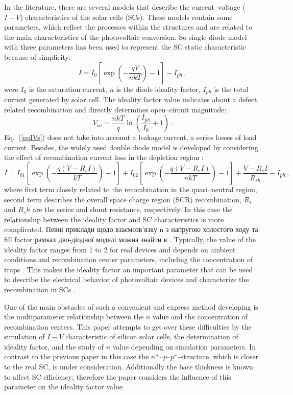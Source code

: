 \documentclass[12pt]{article}
\begin{document}
In the literature, there are several models that describe the current--voltage ($I-V$) characteristics of the solar cells (SCs).
These models contain some parameters, which reflect the processes within the structures and are related to the main characteristics of the photovoltaic conversion.
So single diode model with three parameters has been used to represent the SC static characteristic because of simplicity:
\begin{equation}
\label{eqIVs}
    I=I_{0}\left[\exp\left(-\frac{qV}{nkT}\right)-1\right]-I_{ph}\,,
\end{equation}
were
$I_0$ is the saturation current,
$n$ is the diode ideality factor,
$I_{ph}$ is the total current generated by solar cell.
The ideality factor value indicates about a defect related recombination and directly determines open--circuit magnitude:
\begin{equation}
\label{eqVoc}
    V_{oc}=\frac{nkT}{q}\ln\left(\frac{I_{ph}}{I_0}+1\right)\,.
\end{equation}
Eq.~(\ref{eqIVs}) does not take into account a leakage current, a series losses of load current.
Besides, the widely used double diode model is developed by considering the effect of recombination current loss
in the depletion region \cite{2Diod:Ishaque,2Diod:Buhler,Breitenstein2013}:
\begin{equation}
\label{eqIVd}
    I=I_{01}\left[\exp\left(-\frac{q(V-R_sI)}{kT}\right)-1\right]
      + I_{02}\left[\exp\left(-\frac{q(V-R_sI)}{nkT}\right)-1\right]
      +\frac{V-R_sI}{R_{sh}}
      -I_{ph}\,,
\end{equation}
where
first term closely related to the recombination in the quasi--neutral region,
second term describes the overall space charge region (SCR) recombination,
$R_s$ and $R_sh$ are the series and shunt resistance, respectively.
In this case the relationship between the ideality factor and SC characteristics is more complicated.
Певні приклади щодо взаємозв'язку n з напругою холостого ходу та fill factor  рамках дво-діодної моделі можна знайти в \cite{Olikh2018SM}.
Typically, the value of the ideality factor ranges from 1 to 2 for real devices and depends on ambient conditions and recombination center parameters,
including the concentration of traps \cite{n2_Beier,n2McIntosh,n2Kaminski,HAMEIRI2013251,Heide}.
This makes the ideality factor an important parameter that can be used to describe the electrical behavior of photovoltaic devices and characterize the recombination in SCs \cite{Duan}.

One of the main obstacles of such a convenient and express method developing is the multiparameter relationship between
the $n$ value and the concentration of recombination centers.
This paper attempts to get over these difficulties by the simulation of $I-V$ characteristic of silicon solar cells,
the determination of ideality factor, and the study of  $n$ value depending on simulation parameters.
In contrast to the previous paper \cite{Olikh2019SM} in this case the $n^+$--$p$--$p^+$-structure,
which is closer to the real SC, is under consideration.
Additionally the base thickness is known \cite{Sach_d,FeB:Schmidt} to affect SC efficiency;
therefore the paper considers the influence of this parameter on the ideality factor value.
\end{document}
